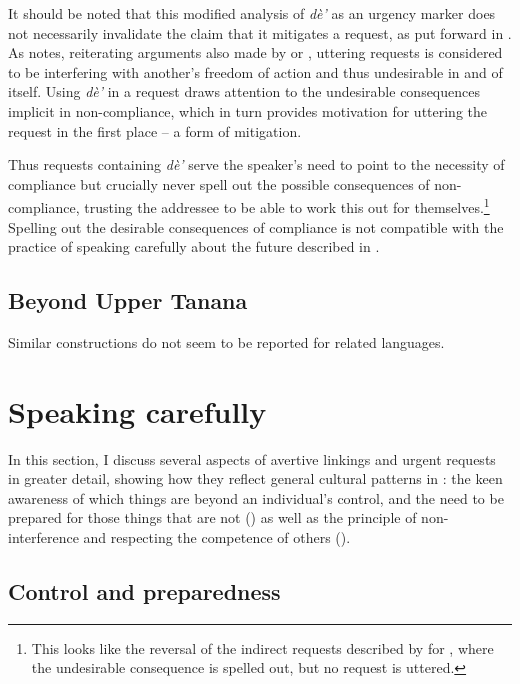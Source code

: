 \documentclass[output=paper,colorlinks,citecolor=brown]{langscibook}
\begin{document}
It should be noted that this modified analysis of \textit{dè'} as an urgency marker does not necessarily invalidate the claim that it mitigates a request, as put forward in \citet[269]{LovickO2016}. As \citet{LovickO2016} notes, reiterating arguments also made by \citet{ScollonRScollonS1981} or \citet{RushforthSChisholmJ1991}, uttering requests is considered to be interfering with another's freedom of action and thus undesirable in and of itself. Using \textit{dè'} in a request draws attention to the undesirable consequences implicit in non-compliance, which in turn provides motivation for uttering the request in the first place -- a form of mitigation. 

Thus requests containing \textit{dè'} serve the speaker's need to point to the necessity of compliance but crucially never spell out the possible consequences of non-compliance, trusting the addressee to be able to work this out for themselves.\footnote{This looks like the reversal of the indirect requests described by \citet{chapters/francois} for , where the undesirable consequence is spelled out, but no request is uttered.} Spelling out the desirable consequences of compliance is not compatible with the  practice of speaking carefully about the future described in .

\subsection{Beyond Upper Tanana}
\label{subsubsection:beyond-urgent}

Similar constructions do not seem to be reported for related languages.


\section{Speaking carefully}
\label{section:speaking-carefully}

In this section, I discuss several aspects of avertive linkings and urgent requests in greater detail, showing how they reflect general cultural patterns in : the keen awareness of which things are beyond an individual's control, and the need to be prepared for those things that are not () as well as the principle of non-interference and respecting the competence of others ().

\subsection{Control and preparedness}
\label{subsection:not-afraid}
\end{document}
